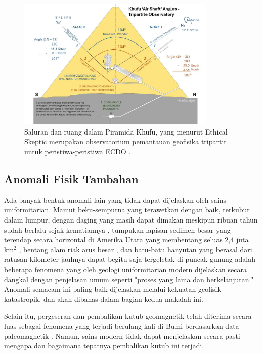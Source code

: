 \documentclass[10pt,twocolumn,letterpaper]{article}
\begin{document}
\begin{figure}[t]
\begin{center}
\includegraphics[width=0.85\textwidth]{shafts.jpg}
\end{center}
   \caption{Saluran dan ruang dalam Piramida Khufu, yang menurut Ethical Skeptic merupakan observatorium pemantauan geofisika tripartit untuk peristiwa-peristiwa ECDO \cite{28}.}
\label{fig:5}
\end{figure}

\subsection{Anomali Fisik Tambahan}
Ada banyak bentuk anomali lain yang tidak dapat dijelaskan oleh sains uniformitarian. Mamut beku-sempurna yang terawetkan dengan baik, terkubur dalam lumpur, dengan daging yang masih dapat dimakan meskipun ribuan tahun sudah berlalu sejak kematiannya \cite{17,18,19}, tumpukan lapisan sedimen besar yang terendap secara horizontal di Amerika Utara yang membentang seluas 2,4 juta km$^2$ \cite{21}, bentang alam riak arus besar \cite{22}, dan batu-batu hanyutan yang berasal dari ratusan kilometer jauhnya dapat begitu saja tergeletak di puncak gunung \cite{23,26} adalah beberapa fenomena yang oleh geologi uniformitarian modern dijelaskan secara dangkal dengan penjelasan umum seperti "proses yang lama dan berkelanjutan." Anomali semacam ini paling baik dijelaskan melalui kekuatan geofisik katastropik, dan akan dibahas dalam bagian kedua makalah ini.

Selain itu, pergeseran dan pembalikan kutub geomagnetik telah diterima secara luas sebagai fenomena yang terjadi berulang kali di Bumi berdasarkan data paleomagnetik \cite{35,40,41}. Namun, sains modern tidak dapat menjelaskan secara pasti mengapa dan bagaimana tepatnya pembalikan kutub ini terjadi.
\end{document}
